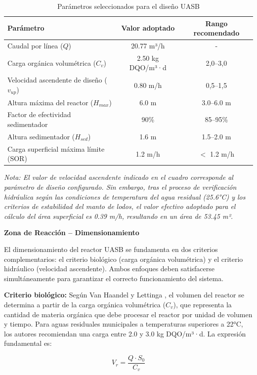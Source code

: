 \documentclass[12pt,a4paper]{article}
\begin{document}
\begin{table}[H]
\centering
\caption{Parámetros seleccionados para el diseño UASB}
\begin{tabular}{p{6cm}cc}
\toprule
\textbf{Parámetro} & \textbf{Valor adoptado} & \textbf{Rango recomendado} \\
\midrule
Caudal por línea ($Q$) & 20.77 m³/h & - \\
Carga orgánica volumétrica ($C_v$) & 2.50 kg DQO/m³·d & 2,0--3,0 \\
Velocidad ascendente de diseño ($v_{up}$) & 0.80 m/h & 0,5--1,5 \\
Altura máxima del reactor ($H_{max}$) & 6.0 m & 3.0--6.0 m \\
Factor de efectividad sedimentador & 90\% & 85--95\% \\
Altura sedimentador ($H_{sed}$) & 1.6 m & 1.5--2.0 m \\
Carga superficial máxima límite (SOR) & 1.2 m/h & $<$ 1.2 m/h \\
\bottomrule
\end{tabular}
\end{table}

\textit{Nota: El valor de velocidad ascendente indicado en el cuadro corresponde al parámetro de diseño configurado. Sin embargo, tras el proceso de verificación hidráulica según las condiciones de temperatura del agua residual (25.6°C) y los criterios de estabilidad del manto de lodos, el valor efectivo adoptado para el cálculo del área superficial es 0.39 m/h, resultando en un área de 53.45 m².}

\textbf{Zona de Reacción -- Dimensionamiento}

El dimensionamiento del reactor UASB se fundamenta en dos criterios complementarios: el criterio biológico (carga orgánica volumétrica) y el criterio hidráulico (velocidad ascendente). Ambos enfoques deben satisfacerse simultáneamente para garantizar el correcto funcionamiento del sistema.

\textbf{Criterio biológico:} Según Van Haandel y Lettinga \cite{vanhaandel1994}, el volumen del reactor se determina a partir de la carga orgánica volumétrica ($C_v$), que representa la cantidad de materia orgánica que debe procesar el reactor por unidad de volumen y tiempo. Para aguas residuales municipales a temperaturas superiores a 22°C, los autores recomiendan una carga entre 2.0 y 3.0 kg DQO/m³·d. La expresión fundamental es:

\begin{equation}
V_r = \frac{Q \cdot S_0}{C_v}
\end{equation}
\end{document}
